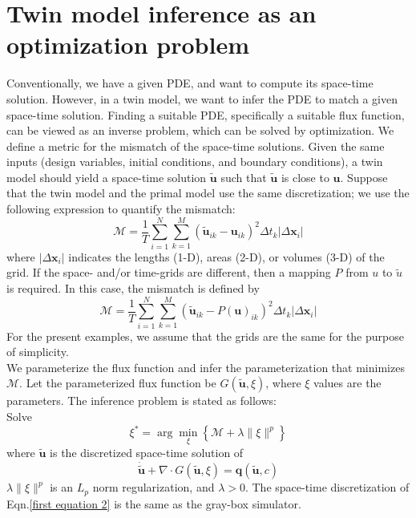 \documentclass{paper1}
\begin{document}
\section{Twin model inference as an optimization problem}
\label{inverse}
Conventionally, we have a given PDE, and want to compute
its space-time solution. However, in a twin model, we want to infer the PDE
to match a given space-time solution.
Finding a suitable PDE, specifically a suitable flux function, can be viewed
as an inverse problem, which can be solved by optimization.
We define a metric for the mismatch of the space-time solutions.
Given the same inputs (design variables, initial conditions, and boundary conditions), 
a twin model should yield a space-time solution $\tilde{\boldsymbol{u}}$ such that 
$\tilde{\boldsymbol{u}}$ is close to $\boldsymbol{u}$. 
Suppose that the twin model and the 
primal model use the same discretization; we use the following expression to quantify
the mismatch:
\begin{equation}
    \mathcal{M} = \frac{1}{T}
    \sum_{i=1}^{N}\sum_{k=1}^{M} \left(\tilde{\boldsymbol{u}}_{ik} 
    - \boldsymbol{u}_{ik}\right)^2 \Delta t_k
    \left| \Delta \mathbf{x}_i \right|
    \label{minimizer twin model discrete}
\end{equation}
where $\left| \Delta \mathbf{x}_i \right|$ indicates the lengths (1-D), areas (2-D), or volumes (3-D) 
of the grid.
If the space- and/or time-grids are different, then a mapping $P$ from $u$ to $\tilde{u}$ is required.
In this case, the mismatch is defined by
\begin{equation}
    \mathcal{M} = \frac{1}{T}
    \sum_{i=1}^{N}\sum_{k=1}^{M} \left(\tilde{\boldsymbol{u}}_{ik} - P(\boldsymbol{u})_{ik}\right)^2 
    \Delta t_k
    \left| \Delta \mathbf{x}_i \right|
    \label{minimizer twin model discrete mapping}
\end{equation}
For the present examples, we assume that the grids are the same for the purpose of simplicity.\\

We parameterize the flux function and infer the parameterization that minimizes $\mathcal{M}$.
Let the parameterized flux function be $G(\tilde{\boldsymbol{u}}, \xi)$,
where $\xi$ values are the parameters.
The inference problem is stated as follows:\\

Solve
\begin{equation}
    \xi^* = 
    \arg\min_{\xi} \left\{
    \mathcal{M}
    + \lambda \|\xi\|^p  \right\}
    \label{objective twin model}
\end{equation}
where $\tilde{\boldsymbol{u}}$
is the discretized space-time solution of
\begin{equation}
    \dot{ \tilde{\boldsymbol{u}}} + \nabla \cdot
    G(\tilde{\boldsymbol{u}}, \xi)
    = \boldsymbol{q}(\tilde{\boldsymbol{u}},c)
    \label{first equation 2}
\end{equation}
 $\lambda\|\xi\|^p$
is an $L_p$ norm regularization, and $\lambda>0$.
The space-time discretization of Eqn.\eqref{first equation 2} is the same as the gray-box simulator.
\\
\end{document}

